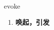 
\begin{frame}
{\huge evoke}
\begin{center}
\begin{enumerate}\Large
  \item \textbf{唤起，引发}
\end{enumerate}
\end{center}
\end{frame}
